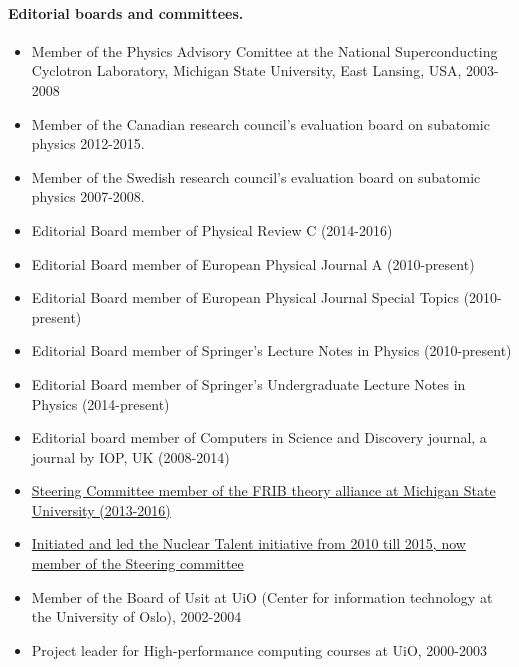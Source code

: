 \documentclass[%
oneside,                 %
final,                   %
10pt]{article}
\begin{document}
\noindent
\paragraph{Editorial boards and committees.}
\begin{itemize}
\item Member of the Physics Advisory Comittee at the National Superconducting Cyclotron Laboratory, Michigan State University, East Lansing, USA, 2003-2008

\item Member of the Canadian research council's evaluation board on subatomic physics 2012-2015.

\item Member of the Swedish research council's evaluation board on subatomic physics 2007-2008.

\item Editorial Board member of Physical Review C (2014-2016)

\item Editorial Board member of European Physical Journal A (2010-present)

\item Editorial Board member of European Physical Journal Special Topics (2010-present)

\item Editorial Board member of Springer's Lecture Notes in Physics (2010-present)

\item Editorial Board member of Springer's Undergraduate Lecture Notes in Physics (2014-present)

\item Editorial board member of Computers in Science and Discovery journal, a journal by IOP, UK (2008-2014)

\item \href{{http://fribtheoryalliance.org/}}{Steering Committee member of the FRIB theory alliance at Michigan State University (2013-2016)}

\item \href{{http://www.nucleartalent.org/}}{Initiated and led the Nuclear Talent initiative from 2010 till 2015, now member of the Steering committee}

\item Member of the Board of Usit at UiO (Center for information technology at the University of Oslo), 2002-2004

\item Project leader for High-performance computing courses at UiO, 2000-2003


\end{itemize}
\end{document}
